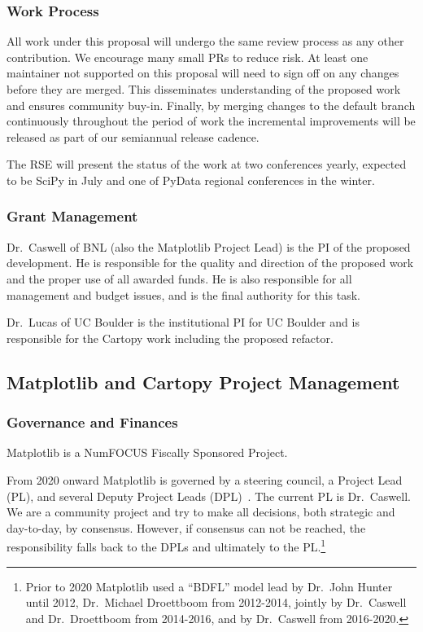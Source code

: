 \documentclass[12pt]{article}
\numberwithin{page}{section}
\begin{document}
\subsubsection{Work Process}

All work under this proposal will undergo the same review process
as any other contribution.  We
encourage many small PRs to reduce risk.  At least one maintainer not
supported on this proposal
will need to sign off on any changes before they are merged. This
disseminates understanding of the proposed work and ensures
community buy-in.  Finally, by merging
changes to the default branch continuously throughout the period of
work the incremental improvements will be released as part of our
semiannual release cadence.

The RSE will present the status of the work at two conferences yearly,
expected to be SciPy in July and one of PyData regional conferences in
the winter.


\subsubsection{Grant Management}

Dr.\ Caswell of BNL (also the Matplotlib Project Lead) is the PI of the proposed
development.  He is responsible for the quality and direction of the proposed
work and the proper use of all awarded funds.  He is also responsible for all
management and budget issues, and is the final authority for this task.

Dr.\ Lucas of UC Boulder is the institutional PI for UC Boulder and is
responsible for the Cartopy work including the proposed refactor.


\subsection{Matplotlib and Cartopy Project Management}
\subsubsection{Governance and Finances}

Matplotlib is a NumFOCUS Fiscally Sponsored Project.

From 2020 onward Matplotlib is governed by a steering council, a Project Lead
(PL), and several Deputy Project Leads (DPL)~\cite{gov}.  The current PL is
Dr.\ Caswell.  We are a community project and try to make all decisions, both
strategic and day-to-day, by consensus.  However, if consensus can not be
reached, the responsibility falls back to the DPLs and ultimately to the
PL.\footnote{Prior to 2020 Matplotlib used a ``BDFL'' model lead by Dr.\ John
Hunter until 2012, Dr.\ Michael Droettboom from 2012-2014, jointly by
Dr.\ Caswell and Dr.\ Droettboom from 2014-2016, and by Dr.\ Caswell from
2016-2020.}
\end{document}
